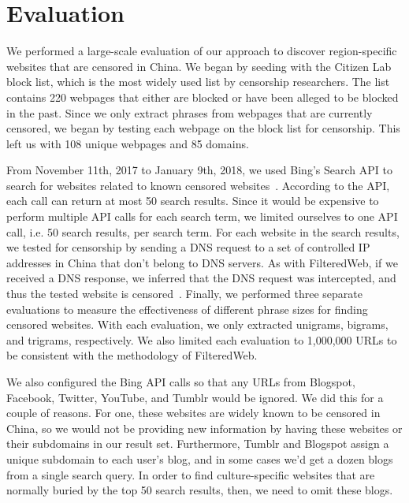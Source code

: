 

\section{Evaluation}

We performed a large-scale evaluation of our approach to
discover region-specific websites that are censored in China.  We
began by seeding with the Citizen Lab block list, which is
the most widely used list by censorship researchers. The list contains
220 webpages that either are blocked or have been alleged to be blocked in
the past. Since we only extract phrases from webpages that are
currently censored, we began by testing each webpage on the block list for
censorship. This left us with 108 unique webpages and 85 domains.

From November 11th, 2017 to January 9th, 2018, we used Bing's Search
API to search for websites related to known censored
websites~\cite{microsoft:bing}. According to the API, each call can
return at most 50 search results. Since it would be expensive to
perform multiple API calls for each search term, we limited ourselves
to one API call, i.e. 50 search results, per search term. For 
each website in the search results, we tested for censorship by
sending a DNS request to a set of controlled IP addresses in China
that don't belong to DNS servers. As with FilteredWeb, if we
received a DNS response, we inferred that the DNS request was
intercepted, and thus the tested website is
censored~\cite{darer2017filteredweb}. Finally, we performed three
separate evaluations to measure the effectiveness of different phrase
sizes for finding censored websites. With each evaluation, we only
extracted unigrams, bigrams, and trigrams, respectively. We also limited
each evaluation to 1,000,000 URLs to be consistent with the
methodology of FilteredWeb.

We also configured the Bing API calls so that any URLs from Blogspot,
Facebook, Twitter, YouTube, and Tumblr would be ignored. We did this
for a couple of reasons. For one, these websites are widely known to
be censored in China, so we would not be providing new information by
having these websites or their subdomains in our result
set. Furthermore, Tumblr and Blogspot assign a unique subdomain to
each user's blog, and in some cases we'd get a dozen blogs from a
single search query. In order to find culture-specific websites that
are normally buried by the top 50 search results, then, we need to
omit these blogs.
